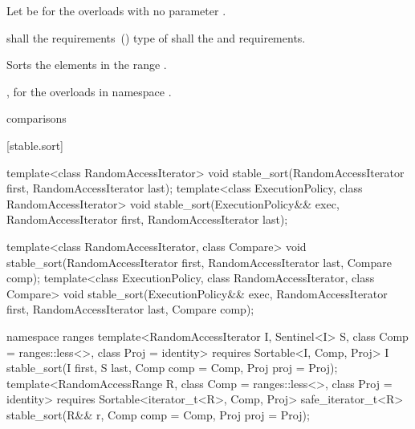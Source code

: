 \begin{itemdescr}
\begin{addedblock}
\pnum
Let  be  for the overloads
with no parameter .
\end{addedblock}

\pnum
\requires
{}
 shall  the
 requirements~() type of  shall  the
 and
 requirements.

\pnum
\effects
Sorts the elements in the range 
.

\begin{addedblock}
\pnum
\returns {}, for the overloads in namespace .
\end{addedblock}

\pnum
\complexity
{} 
comparisons
\end{itemdescr}


[stable.sort]{}

%
\begin{itemdecl}
template<class RandomAccessIterator>
  void stable_sort(RandomAccessIterator first, RandomAccessIterator last);
template<class ExecutionPolicy, class RandomAccessIterator>
  void stable_sort(ExecutionPolicy&& exec,
                   RandomAccessIterator first, RandomAccessIterator last);

template<class RandomAccessIterator, class Compare>
  void stable_sort(RandomAccessIterator first, RandomAccessIterator last,
                   Compare comp);
template<class ExecutionPolicy, class RandomAccessIterator, class Compare>
  void stable_sort(ExecutionPolicy&& exec,
                   RandomAccessIterator first, RandomAccessIterator last,
                   Compare comp);
\end{itemdecl}
\begin{addedblock}
\begin{itemdecl}
namespace ranges {
  template<RandomAccessIterator I, Sentinel<I> S, class Comp = ranges::less<>,
      class Proj = identity>
    requires Sortable<I, Comp, Proj>
    I stable_sort(I first, S last, Comp comp = Comp{}, Proj proj = Proj{});
  template<RandomAccessRange R, class Comp = ranges::less<>, class Proj = identity>
    requires Sortable<iterator_t<R>, Comp, Proj>
    safe_iterator_t<R>
      stable_sort(R&& r, Comp comp = Comp{}, Proj proj = Proj{});
}
\end{itemdecl}
\end{addedblock}

